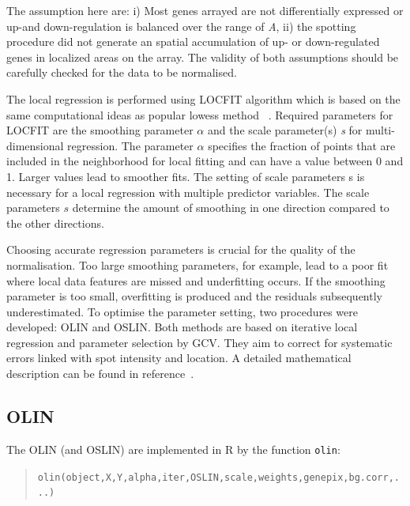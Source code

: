 \documentclass[a4paper,11pt]{article}
\begin{document}
 The assumption here are: i) Most genes arrayed are not differentially expressed or 
up-and down-regulation is balanced over the range of \emph{A},  ii) the spotting procedure did not generate an spatial accumulation of up- or down-regulated genes in localized areas on the array. 
The validity of both assumptions  should be carefully checked for the data to be normalised. 


The local regression is performed using LOCFIT algorithm which is based on the same 
computational ideas as popular lowess method~\cite{loader,cleveland} .  Required parameters for LOCFIT 
are the smoothing parameter $\alpha$  and the scale parameter(s) \emph{s}
for multi-dimensional regression.
The parameter $\alpha$  specifies the fraction of points that are included in the neighborhood for 
local fitting  and can have a  value between 0 and 1. Larger  values lead to smoother fits.  
The setting of scale parameters s is necessary for a local regression with multiple  
predictor variables. The scale parameters $s$  determine the  amount of smoothing in one direction 
compared to the other directions.   


Choosing accurate regression parameters is crucial for the quality of the normalisation. 
Too large smoothing parameters, for example, lead to a poor fit where local data features are missed
and underfitting occurs.  If the smoothing parameter is too small,  overfitting is produced and
the residuals subsequently underestimated. 
To optimise the parameter setting, two procedures were developed: OLIN and OSLIN. Both methods
are based  on iterative local regression and parameter selection by GCV.
 They aim to correct for systematic errors linked with spot intensity and location. A detailed mathematical description can be found in reference~\cite{toni}.


\subsection{OLIN}
The OLIN (and OSLIN) are implemented in R by the function \texttt{olin}:

\begin{quote}
\texttt{olin(object,X,Y,alpha,iter,OSLIN,scale,weights,genepix,bg.corr,...)}
\end{quote}
\end{document}
